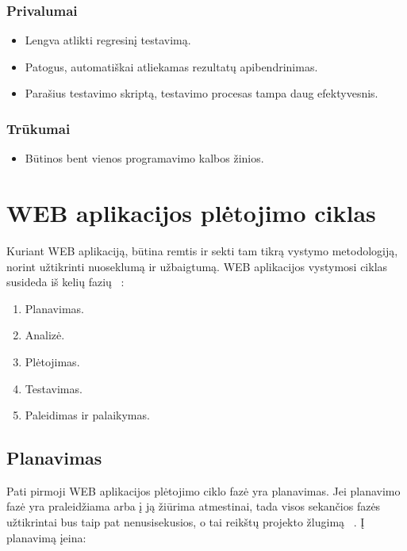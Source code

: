 \documentclass[a4paper,12pt,fleqn]{article}
\begin{document}
\subsubsection{Privalumai}
\begin{itemize}
    \item Lengva atlikti regresinį testavimą.
    \item Patogus, automatiškai atliekamas rezultatų apibendrinimas.
    \item Parašius testavimo skriptą, testavimo procesas tampa daug efektyvesnis.
\end{itemize}

\subsubsection{Trūkumai}
\begin{itemize}
    \item Būtinos bent vienos programavimo kalbos žinios.
\end{itemize}

\section{WEB aplikacijos plėtojimo ciklas}
Kuriant WEB aplikaciją, būtina remtis ir sekti tam tikrą vystymo metodologiją, norint užtikrinti nuoseklumą ir užbaigtumą. WEB aplikacijos vystymosi ciklas susideda iš kelių fazių ~\cite{french1970web}:

\begin{enumerate}
    \item Planavimas.
    \item Analizė.
    \item Plėtojimas.
    \item Testavimas.
    \item Paleidimas ir palaikymas.
\end{enumerate}

\subsection{Planavimas}
Pati pirmoji WEB aplikacijos plėtojimo ciklo fazė yra planavimas. Jei planavimo fazė yra praleidžiama arba į ją žiūrima atmestinai, tada visos sekančios fazės užtikrintai bus taip pat nenusisekusios, o tai reikštų projekto žlugimą ~\cite{french1970web}. Į planavimą įeina:
\end{document}
